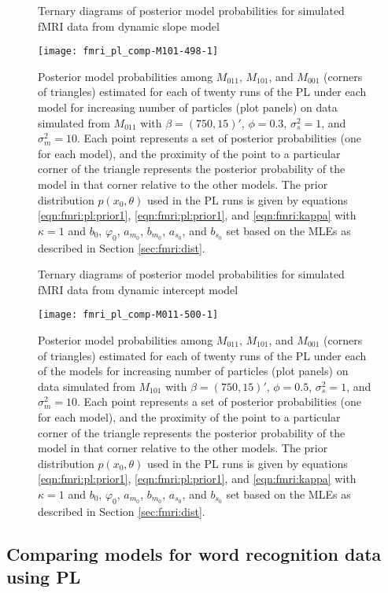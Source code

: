 \begin{figure}
\ssp
\centering
\caption{Ternary diagrams of posterior model probabilities for simulated fMRI data from dynamic slope model} \label{fig:fmri:comp:M011}
\texttt{[image: fmri\_pl\_comp-M101-498-1]}
\caption*{Posterior model probabilities among $M_{011}$, $M_{101}$, and $M_{001}$ (corners of triangles) estimated for each of twenty runs of the PL under each model for increasing number of particles (plot panels) on data simulated from $M_{011}$ with $\beta = (750,15)'$, $\phi = 0.3$, $\sigma^2_s = 1$, and $\sigma^2_m = 10$. Each point represents a set of posterior probabilities (one for each model), and the proximity of the point to a particular corner of the triangle represents the posterior probability of the model in that corner relative to the other models. The prior distribution $p(x_0,\theta)$ used in the PL runs is given by equations \eqref{eqn:fmri:pl:prior1}, \eqref{eqn:fmri:pl:prior1}, and \eqref{eqn:fmri:kappa} with $\kappa = 1$ and $b_0$, $\varphi_0$, $a_{m_0}$, $b_{m_0}$, $a_{s_0}$, and $b_{s_0}$ set based on the MLEs as described in Section \ref{sec:fmri:dist}.}
\end{figure}

\begin{figure}
\ssp
\centering
\caption{Ternary diagrams of posterior model probabilities for simulated fMRI data from dynamic intercept model} \label{fig:fmri:comp:M101}
\texttt{[image: fmri\_pl\_comp-M011-500-1]}
\caption*{Posterior model probabilities among $M_{011}$, $M_{101}$, and $M_{001}$ (corners of triangles) estimated for each of twenty runs of the PL under each of the models for increasing number of particles (plot panels) on data simulated from $M_{101}$ with $\beta = (750,15)'$, $\phi = 0.5$, $\sigma^2_s = 1$, and $\sigma^2_m = 10$. Each point represents a set of posterior probabilities (one for each model), and the proximity of the point to a particular corner of the triangle represents the posterior probability of the model in that corner relative to the other models. The prior distribution $p(x_0,\theta)$ used in the PL runs is given by equations \eqref{eqn:fmri:pl:prior1}, \eqref{eqn:fmri:pl:prior1}, and \eqref{eqn:fmri:kappa} with $\kappa = 1$ and $b_0$, $\varphi_0$, $a_{m_0}$, $b_{m_0}$, $a_{s_0}$, and $b_{s_0}$ set based on the MLEs as described in Section \ref{sec:fmri:dist}.}
\end{figure}

\subsection{Comparing models for word recognition data using PL \label{sec:fmri:real}}

